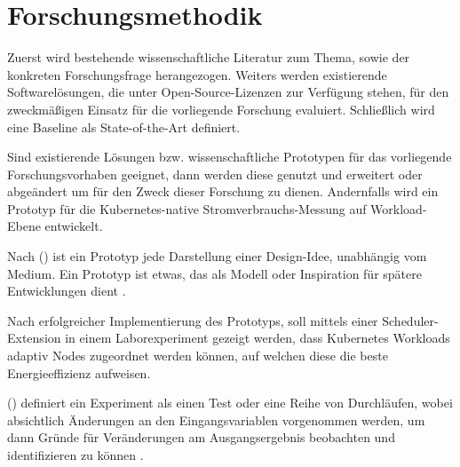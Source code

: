 \chapter{Forschungsmethodik}

Zuerst wird bestehende wissenschaftliche Literatur zum Thema, 
sowie der konkreten Forschungsfrage herangezogen.
Weiters werden existierende Softwarelösungen,
die unter Open-Source-Lizenzen zur Verfügung stehen,
für den zweckmäßigen Einsatz für die vorliegende Forschung evaluiert.
Schließlich wird eine Baseline als State-of-the-Art definiert.
\bigskip

Sind existierende Lösungen bzw. wissenschaftliche Prototypen für das vorliegende Forschungsvorhaben geeignet,
dann werden diese genutzt und erweitert oder abgeändert um für den Zweck dieser Forschung zu dienen.
Andernfalls wird ein Prototyp für die Kubernetes-native Stromverbrauchs-Messung auf Workload-Ebene entwickelt.
\bigskip

Nach 
\citeauthor{HOUDE1997367} (\citeyear{HOUDE1997367})
ist ein Prototyp jede Darstellung einer Design-Idee, unabhängig vom Medium.
Ein Prototyp ist etwas, das als Modell oder Inspiration für spätere Entwicklungen dient
\autocite{HOUDE1997367}.
\bigskip

Nach erfolgreicher Implementierung des Prototyps,
soll mittels einer Scheduler-Extension in einem Laborexperiment gezeigt werden,
dass Kubernetes Workloads adaptiv Nodes zugeordnet werden können,
auf welchen diese die beste Energieeffizienz aufweisen.
\bigskip


\citeauthor{montgomery2017design} (\citeyear{montgomery2017design}) definiert ein Experiment als einen Test 
oder eine Reihe von Durchläufen, wobei absichtlich Änderungen an den Eingangsvariablen vorgenommen werden, 
um dann Gründe für Veränderungen am Ausgangsergebnis beobachten und identifizieren zu können 
\autocite{montgomery2017design}.


